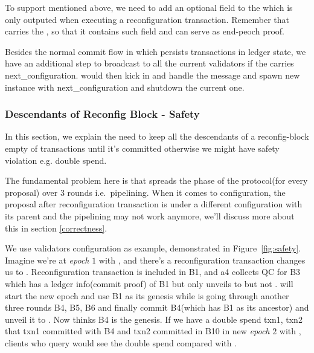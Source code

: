 To support  mentioned above, we need to add an optional field  to the 
which is only outputed when executing a reconfiguration transaction. Remember that  carries the ,
so that it contains such field and can serve as end-peoch proof.

Besides the normal commit flow in \LBFT which persists transactions in ledger state, we have an additional step to broadcast
 to all the current validators if the  carries next\_configuration. 
would then kick in and handle the  message and spawn new \LBFT instance with next\_configuration and shutdown the current one.

\subsubsection{Descendants of Reconfig Block - Safety} \label{safety}

In this section, we explain the need to keep all the descendants of a reconfig-block empty of transactions until it's committed otherwise we might
have safety violation e.g. double spend.

The fundamental problem here is that \LBFT spreads the phase of the protocol(for every proposal) over 3 rounds i.e.\ pipelining.
When it comes to configuration, the proposal after reconfiguration transaction is under a different configuration with its
parent and the pipelining may not work anymore, we'll discuss more about this in section \ref{correctness}.

We use validators configuration as example, demonstrated in Figure~\ref{fig:safety}. Imagine we're at \emph{epoch} $1$ with
, and there's a reconfiguration transaction changes us to .
Reconfiguration transaction is included in B1, and a4 collects QC for B3 which has a ledger info(commit proof) of B1 but only unveils to  but not .  will start the new epoch and use B1 as its genesis while 
is going through another three rounds B4, B5, B6 and finally commit B4(which has B1 as its ancestor) and unveil it to .
Now  thinks B4 is the genesis. If we have a double spend txn1, txn2 that txn1 committed with B4 and txn2 committed in B10 in
new \emph{epoch} $2$ with , clients who query  would see the double spend compared with .

